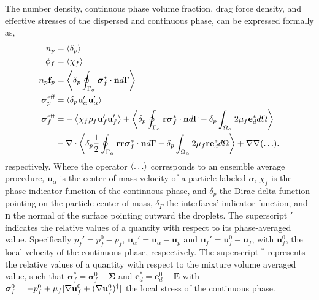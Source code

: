 The number density, continuous phase volume fraction, drag force density, and effective stresses of the dispersed and continuous phase, can be expressed formally as,
\begin{align}
    n_p &= \pavg{}
    \label{eq:n_p}\\
    \phi_f &= \avg{\chi_f}
    \label{eq:chi_f}\\
    n_p \textbf{f}_p  &= \pSavg{\bm\sigma^*_f\cdot \textbf{n}}
    \label{eq:f_alpha}
    \\
    \bm{\sigma}_p^{\text{eff}} &= \pavg{\textbf{u}_\alpha'\textbf{u}_\alpha'}
    \label{eq:def_uup}
    \\
    \bm{\sigma}^{\text{eff}}_f 
    &= 
    - \avg{\chi_f\rho_f \textbf{u}_f'\textbf{u}_f'} 
    + \pavg{\intS{\textbf{r}\bm\sigma^{*}_f\cdot \textbf{n}} - \delta_p\intO{2\mu_f\textbf{e}_d^*}}\nonumber\\
    &- \div
        \pavg{ \frac{1}{2}\intS{\textbf{rr}\bm\sigma^{*}_f\cdot \textbf{n}}
        - \delta_p\intO{2\mu_f \textbf{r} \textbf{e}_d^*}}
        + \grad\grad (\ldots). 
    \label{eq:def_sigma_eff_f}
\end{align}
respectively. 
Where the operator $\left<\ldots\right>$ corresponds to an ensemble average procedure, 
$\textbf{u}_\alpha$ is the center of mass velocity of a particle labeled $\alpha$, $\chi_f$ is the phase indicator function of the continuous phase, and $\delta_p$ the Dirac delta function pointing on the particle center of mass, $\delta_\Gamma$ the interfaces' indicator function, and \textbf{n} the normal of the surface pointing outward the droplets. 
The superscript $'$ indicates the relative values of a quantity with respect to its phase-averaged value. 
Specifically $p_f' = p_f^0 - p_f$, $\textbf{u}_\alpha' = \textbf{u}_\alpha - \textbf{u}_p$ and $\textbf{u}_f' = \textbf{u}_f^0  -\textbf{u}_f$, with $\textbf{u}_f^0$,  the local velocity of the continuous phase, respectively. 
The superscript $^*$ represents the relative values of a quantity with respect to the mixture volume averaged value, such that $\bm{\sigma}_f^* = \bm{\sigma}_f^0  - \bm{\Sigma}$ and $\textbf{e}_d^* = \textbf{e}_d^0 - \textbf{E}$ with $\bm{\sigma}_f^0 = -p_f^0 + \mu_f [\mathbf{\nabla} \textbf{u}_f^0 + (\mathbf{\nabla} \textbf{u}_f^0)^\dagger]$ the local stress of the continuous phase. 




